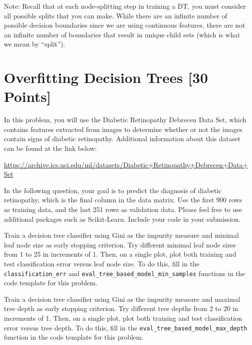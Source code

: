 \documentclass{article}
\begin{document}
Note: Recall that at each node-splitting step in training a DT, you must consider all possible splits that you can make. While there are an infinite number of possible decision boundaries since we are using continuous features, there are not an infinite number of boundaries that result in unique child sets (which is what we mean by ``split'').



\begin{solution}

\end{solution}




\newpage


\section{Overfitting Decision Trees [30 Points]}

In this problem, you will use the Diabetic Retinopathy Debrecen Data Set, which contains features extracted from images to determine whether or not the images contain signs of diabetic retinopathy. Additional information about this dataset can be found at the link below:

\url{https://archive.ics.uci.edu/ml/datasets/Diabetic+Retinopathy+Debrecen+Data+Set}

In the following question, your goal is to predict the diagnosis of diabetic retinopathy, which is the final column in the data matrix.  Use the first 900 rows as training data, and the last
251 rows as validation data. Please feel free to use additional packages such as Scikit-Learn. Include your code in your submission.

\indent\problem[7] %
Train a decision tree classifier using Gini as the impurity measure and minimal leaf node size as early stopping criterion. Try different minimal leaf node sizes from 1 to 25 in increments of 1. Then, on a single plot, plot both training and test classification error versus leaf node size. To do this, fill in the \texttt{classification_err} and \texttt{eval_tree_based_model_min_samples} functions in the code template for this problem.

\begin{solution}

\end{solution}

\problem[7]
Train a decision tree classifier using Gini as the impurity measure and maximal tree depth as early stopping criterion. Try different tree depths from 2 to 20 in increments of 1. Then, on a single plot, plot both training and test classification error versus tree depth. To do this, fill in the \texttt{eval_tree_based_model_max_depth} function in the code template for this problem.
\end{document}
